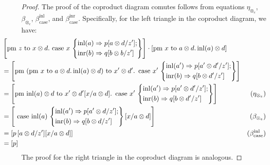 \begin{proof}
The proof of the coproduct diagram comutes follows  from equations $\eta_{\otimes_e}$, $\beta_{\otimes_e}$, $\beta_{\text{case}}^{\text{inl}}$, and  $\beta_{\text{case}}^{\text{inr}}$. Specifically, for the left triangle in the coproduct diagram, we have:
  \begin{align*}
    &  \hspace{-30pt} \left[\text{pm } z \text{ to } x \otimes d. \text{ case } x\, \left\{ \begin{aligned}
      & \inl(a) \Rightarrow p[a \otimes d/z'];\\
      & \inr(b) \Rightarrow q [b \otimes b/z']
    \end{aligned}
      \right\}
      \right] \comp \left[\text{pm }x \text{ to } a\otimes d. \, \inl(a) \otimes d \right]  \\
    &  \hspace{-30pt}  = \left[ \text{pm } (\text{pm }x \text{ to } a\otimes d. \, \inl(a) \otimes d ) \text{ to } x' \otimes d' . \, \text{ case } x'\, \left\{ \begin{aligned}
      & \inl(a') \Rightarrow p[a' \otimes d'/z'];\\
      & \inr(b) \Rightarrow q [b \otimes d'/z']
    \end{aligned} \right\} \right] \\
    &   \hspace{-30pt} = \left[ \text{pm } \inl(a) \otimes d  \text{ to } x' \otimes d' [x/ a \otimes d]. \, \text{ case } x'\, \left\{ \begin{aligned}
      & \inl(a') \Rightarrow p[a' \otimes d'/z'];\\
      & \inr(b) \Rightarrow q [b \otimes d'/z']
    \end{aligned} \right\} \right] & (\eta_{\otimes_e})  \\
     &   \hspace{-30pt} = \left[\text{ case } \inl(a)\, \left\{ \begin{aligned}
      & \inl(a') \Rightarrow p[a' \otimes d/z'];\\
      & \inr(b) \Rightarrow q [b \otimes d/z']
    \end{aligned} \right\} [x/ a \otimes d] \right] & (\beta_{\otimes_e})  \\
    &   \hspace{-30pt} = \left[ p \, [a \otimes d/z'] [x/ a \otimes d] \right]& (\beta_{\text{case}}^{\text{inl}}) \\
       & \hspace{-30pt} = \left[ p \right]
  \end{align*}
  The proof for the right triangle in the coproduct diagram is analogous.


\end{proof}
